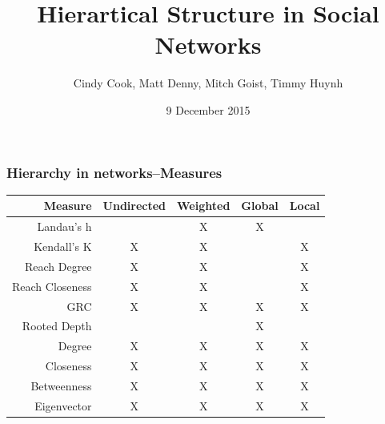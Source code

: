\documentclass{beamer}
\title[Hierartical Structure in Social Networks]{Hierartical Structure in Social Networks}
\author{Cindy Cook, Matt Denny, Mitch Goist, Timmy Huynh}
\institute{SODA502:  Final Project}
\date{9 December 2015}
\begin{document}
		
		\frame{\titlepage}


\begin{frame}\frametitle{Hierarchy in networks--Measures}
	\begin{table}
		\begin{tabular}{| r || c | c | c | c |}
			\hline
			Measure & Undirected & Weighted & Global & Local \\
			\hline
			Landau's h & & X& X& \\
			Kendall's K & X& X& &X\\
			Reach Degree & X& X& &X\\
			Reach Closeness & X& X& &X\\
			GRC & X& X& X&X\\
			Rooted Depth & & & X&\\
			Degree & X& X& X&X\\
			Closeness & X& X& X&X\\
			Betweenness & X& X& X&X\\
			Eigenvector &  X& X& X& X \\
			\hline
		\end{tabular}
	\end{table}
\end{frame}
\end{document}

